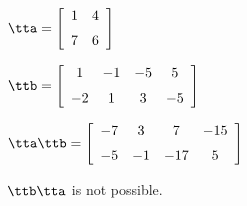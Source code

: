 {$\tta = \left[ \begin {array}{cc} 1&4\\\noalign{\medskip}7&6\end {array}
 \right] $ 

$\ttb =  \left[ \begin {array}{cccc} 1&-1&-5&5\\\noalign{\medskip}-2&1&3&-5
\end {array} \right]   $}
{$\tta\ttb = \left[ \begin {array}{cccc} -7&3&7&-15\\\noalign{\medskip}-5&-1&-17&5
\end {array} \right] $

$\ttb\tta$ is not possible.}

 

 

 



  

 

